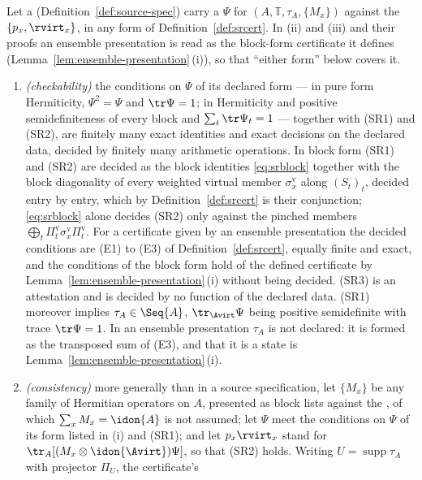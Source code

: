 \begin{theorem}
\label{thm:certificate-sufficiency}
Let a  (Definition~\ref{def:source-spec}) carry a
 $\Psi$ for $(A,\mathbb{T},\tau_A,\{M_x\})$
against the  $\{p_x,\rvirt_x\}$, in any form of
Definition~\ref{def:srcert}. In (ii) and (iii) and their proofs an ensemble
presentation is read as the block-form certificate it defines
(Lemma~\ref{lem:ensemble-presentation}\,(i)), so that ``either form'' below
covers it.
\begin{enumerate}[label=(\roman*),leftmargin=2.2em]
\item \emph{(checkability)} the conditions on $\Psi$ of its declared form
--- in pure form Hermiticity, $\Psi^2=\Psi$ and $\tr\Psi=1$; in 
Hermiticity and positive semidefiniteness of every block and
$\sum_t\tr\Psi_t=1$ --- together with (SR1) and (SR2), are finitely many
exact identities and exact decisions on the declared data, decided by
finitely many arithmetic operations. In block form (SR1) and (SR2) are decided
as the block identities \eqref{eq:srblock} together with the block diagonality
of every weighted virtual member $\sigma^{\mathrm v}_x$ along $(S_t)_t$,
decided entry by entry, which by Definition~\ref{def:srcert} is their
conjunction; \eqref{eq:srblock} alone decides (SR2) only against the pinched
members $\bigoplus_t\Pi^{\mathrm v}_t\sigma^{\mathrm v}_x\Pi^{\mathrm v}_t$.
For a certificate given by an ensemble
presentation the decided conditions are (E1) to (E3) of
Definition~\ref{def:srcert}, equally finite and exact, and the conditions
of the block form hold of the defined certificate by
Lemma~\ref{lem:ensemble-presentation}\,(i) without being decided. (SR3) is
an attestation and is decided by no function of the declared data. (SR1)
moreover implies $\tau_A\in\Seq{A}$, $\tr_{\Avirt}\Psi$ being positive
semidefinite with trace $\tr\Psi=1$. In an ensemble presentation $\tau_A$ is
not declared: it is formed as the transposed sum of (E3), and that it is a
state is Lemma~\ref{lem:ensemble-presentation}\,(i).
\item \emph{(consistency)} more generally than in a source specification,
let $\{M_x\}$ be any family of Hermitian operators on $A$, presented as block
lists against the , of which $\sum_xM_x=\idon{A}$ is not
assumed; let $\Psi$ meet the conditions on $\Psi$ of its form listed in (i)
and (SR1); and let $p_x\rvirt_x$ stand for
$\tr_A[(M_x\otimes\idon{\Avirt})\Psi]$, so that (SR2) holds. Writing
$U=\operatorname{supp}\tau_A$ with projector $\Pi_U$, the certificate's

\end{enumerate}
\end{theorem}
